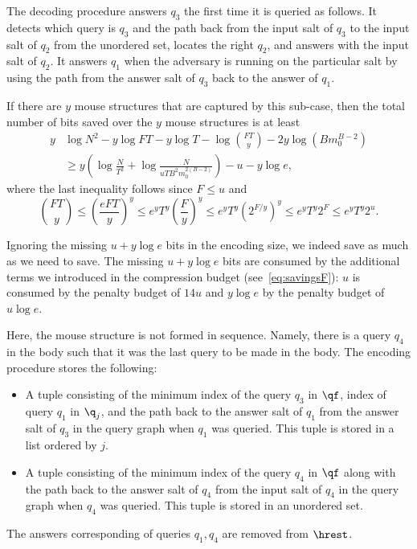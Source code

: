 {The decoding procedure answers $q_3$ the first time it is queried as follows. It detects which query is $q_3$ and the path back from the input salt of $q_3$ to the input salt of $q_2$ from the unordered set, locates the right $q_2$, and answers with the input salt of $q_2$. It answers $q_1$ when the adversary is running on the particular salt by using the path from the answer salt of $q_3$ back to the answer of $q_1$.

If there are $y$ mouse structures that are captured by this sub-case, then the total number of bits saved over the $y$ mouse structures is at least
\begin{align*}
y& \log N^2-y\log FT - y\log T -\log \binom {FT}{y} -2y\log (Bm_0^{B-2}) \\ 
& \ge y\left(\log \frac{N}{T^2} +\log \frac{N}{uTB^2m_0^{2(B-2)}}\right)-u -y \log e ,
\end{align*}
where the last inequality follows since $F\le u$ and $$\binom{FT}{y}\le \left(\frac{eFT}{y}\right)^y\le e^yT^y \left(\frac{F}{y}\right)^y\le e^yT^y (2^{F/y})^y\leq e^yT^y 2^F\leq  e^yT^y 2^u.$$ 

Ignoring the missing $u+y \log e$ bits in the encoding size, we indeed save as much as we need to save. The missing $u+y\log e$ bits are consumed by the additional terms we introduced in the compression budget (see~\eqref{eq:savingsF}): $u$ is consumed by the penalty budget of $14u$ and $y\log e$ by the penalty budget of $u\log e$. 



Here, the mouse structure is not formed in sequence.
Namely, there is a query $q_4$ in the body such that it was the last query to be made in the body. The encoding procedure stores the following:
\begin{itemize}
  \item A tuple consisting of the minimum index of the query $q_3$ in $\qf$, index of query $q_1$ in $\q_j$, and the path back to the answer salt of $q_1$ from the answer salt of $q_3$ in the query graph when $q_1$ was queried.  This tuple is stored in a list ordered by $j$.
  \item A tuple consisting of the minimum index of the query $q_4$ in $\qf$ along with the path back to the answer salt of $q_4$ from the input salt of $q_4$ in the query graph when $q_4$ was queried. This tuple is stored in an unordered set.
\end{itemize}
The answers corresponding of queries $q_1,q_4$ are removed from $\hrest$.

}
